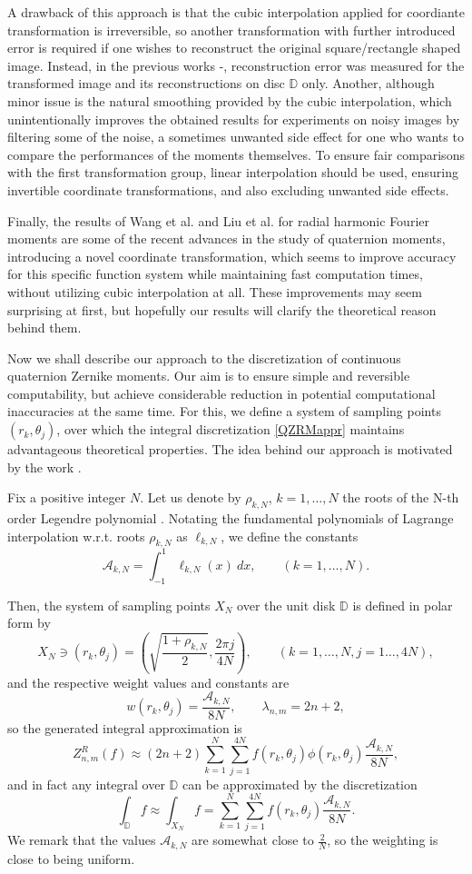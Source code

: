 \documentclass[12pt]{article}
\newcommand{\D}{\mathbb{D}}
\begin{document}
A drawback of this approach is that the cubic interpolation applied for coordiante transformation is irreversible, so another transformation with further introduced error is required if one wishes to reconstruct the original square/rectangle shaped image. Instead, in the previous works \cite{LiaoPawlak}-\cite{HosnyChebyshev}, reconstruction error was measured for the transformed image and its reconstructions on disc $\D$ only. Another, although minor issue is the natural smoothing provided by the cubic interpolation, which unintentionally improves the obtained results for experiments on noisy images by filtering some of the noise, a sometimes unwanted side effect for one who wants to compare the performances of the moments themselves. To ensure fair comparisons with the first transformation group, linear interpolation should be used, ensuring invertible coordinate transformations, and also excluding unwanted side effects.

Finally, the results of Wang et al. \cite{WangAcc} and Liu et al. \cite{LiuAcc} for radial harmonic Fourier moments are some of the recent advances in the study of quaternion moments, introducing a novel coordinate transformation, which seems to improve accuracy for this specific function system while maintaining fast computation times, without utilizing cubic interpolation at all. These improvements may seem surprising at first, but hopefully our results will clarify the theoretical reason behind them.

Now we shall describe our approach to the discretization of continuous quaternion Zernike moments. Our aim is to ensure simple and reversible computability, but achieve considerable reduction in potential computational inaccuracies at the same time. For this, we define a system of sampling points $(r_k,\theta_j)$, over which the integral discretization \eqref{QZRMappr} maintains advantageous theoretical properties. The idea behind our approach is motivated by the work \cite{PapSchipp}.

Fix a positive integer $N$. Let us denote by $\rho_{k,N}$, $k=1,\ldots,N$ the roots of the N-th order Legendre polynomial \cite{Szego}. Notating the fundamental polynomials of Lagrange interpolation w.r.t. roots $\rho_{k,N}$ as $\ell_{k,N}$, we define the constants
\[
	\mathcal{A}_{k,N} = \int_{-1}^{1} \ell_{k,N}(x)\ dx, \qquad (k=1,\ldots,N).
\]

Then, the system of sampling points $X_N$ over the unit disk $\D$ is defined in polar form by
\[
	X_N\ni (r_k, \theta_j) = \left(\sqrt{\frac{1+\rho_{k,N}}{2}} , \frac{2\pi j}{4N} \right), \qquad (k=1,\ldots,N,j=1\ldots,4N),
\]
and the respective weight values and constants are
\[
	w(r_k,\theta_j) = \frac{\mathcal{A}_{k,N}}{8N},\qquad \lambda_{n,m} = 2n+2,
\]
so the generated integral approximation is
\[
	Z_{n,m}^R(f) \approx (2n+2) \sum_{k=1}^{N} \sum_{j=1}^{4N} f(r_k,\theta_j) \phi(r_k,\theta_j) \frac{\mathcal{A}_{k,N}}{8N},
\]
and in fact any integral over $\D$ can be approximated by the discretization
\[
	\int_\D f \approx \int_{X_N} f = \sum_{k=1}^{N} \sum_{j=1}^{4N} f(r_k,\theta_j) \frac{\mathcal{A}_{k,N}}{8N}.
\]
We remark that the values $\mathcal{A}_{k,N}$ are somewhat close to $\frac{2}{N}$, so the weighting is close to being uniform.
\end{document}
